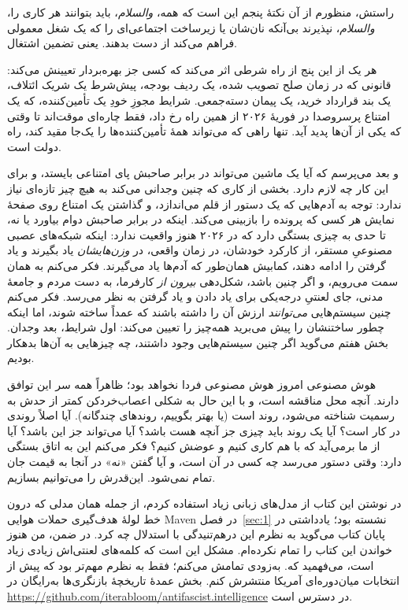 راستش، منظورم از آن نکتهٔ پنجم این است که همه، \emph{والسلام}، باید بتوانند هر کاری را، \emph{والسلام}، نپذیرند بی‌آنکه نان‌شان یا زیرساخت اجتماعی‌ای را که یک شغل معمولی فراهم می‌کند از دست بدهند. یعنی تضمین اشتغال.

هر یک از این پنج از راه شرطی اثر می‌کند که کسی جز بهره‌بردار تعیینش می‌کند: قانونی که در زمان صلح تصویب شده، یک ردیف بودجه، پیش‌شرط یک شریک ائتلاف، یک بند قرارداد خرید، یک پیمان دسته‌جمعی. شرایط مجوزِ خودِ یک تأمین‌کننده، که یک امتناع پرسروصدا در فوریهٔ ۲۰۲۶ از همین راه رخ داد، فقط چاره‌ای موقت‌اند تا وقتی که یکی از آن‌ها پدید آید. تنها راهی که می‌تواند همهٔ تأمین‌کننده‌ها را یک‌جا مقید کند، راه دولت است.

و بعد می‌پرسم که آیا یک ماشین می‌تواند در برابر صاحبش پای امتناعی بایستد، و برای این کار چه لازم دارد. بخشی از کاری که چنین وجدانی می‌کند به هیچ چیز تازه‌ای نیاز ندارد: توجه به آدم‌هایی که یک دستور از قلم می‌اندازد، و گذاشتن یک امتناع روی صفحهٔ نمایش هر کسی که پرونده را بازبینی می‌کند. اینکه در برابر صاحبش دوام بیاورد یا نه، تا حدی به چیزی بستگی دارد که در ۲۰۲۶ هنوز واقعیت ندارد: اینکه شبکه‌های عصبی مصنوعیِ مستقر، از کارکرد خودشان، در زمان واقعی، در \emph{وزن‌هایشان} یاد بگیرند و یاد گرفتن را ادامه دهند، کمابیش همان‌طور که آدم‌ها یاد می‌گیرند. فکر می‌کنم به همان سمت می‌رویم، و اگر چنین باشد، شکل‌دهی \emph{بیرون از} کارفرما، به دست مردم و جامعهٔ مدنی، جای لعنتیِ درجه‌یکی برای یاد دادن و یاد گرفتن به نظر می‌رسد. فکر می‌کنم چنین سیستم‌هایی \emph{می‌توانند} ارزش آن را داشته باشند که عمداً ساخته شوند، اما اینکه چطور ساختنشان را پیش می‌برید همه‌چیز را تعیین می‌کند: اول شرایط، بعد وجدان. بخش هفتم می‌گوید اگر چنین سیستم‌هایی وجود داشتند، چه چیزهایی به آن‌ها بدهکار بودیم.

هوش مصنوعی امروز هوش مصنوعی فردا نخواهد بود؛ ظاهراً همه سر این توافق دارند. آنچه محل مناقشه است، و با این حال به شکلی اعصاب‌خردکن کمتر از حدش به رسمیت شناخته می‌شود، روند است (یا بهتر بگوییم، روندهای چندگانه). آیا اصلاً روندی در کار است؟ آیا یک روند باید چیزی جز آنچه هست باشد؟ آیا می‌تواند جز این باشد؟ آیا از ما برمی‌آید که با هم کاری کنیم و عوضش کنیم؟ فکر می‌کنم این به اتاق بستگی دارد: وقتی دستور می‌رسد چه کسی در آن است، و آیا گفتن «نه» در آنجا به قیمت جان تمام نمی‌شود. این‌قدرش را می‌توانیم بسازیم.

در نوشتن این کتاب از مدل‌های زبانی زیاد استفاده کردم، از جمله همان مدلی که درون خط لولهٔ هدف‌گیری حملات هوایی Maven در فصل~\ref{sec:1} نشسته بود؛ یادداشتی در پایان کتاب می‌گوید به نظرم این درهم‌تنیدگی با استدلال چه کرد. در ضمن، من هنوز خواندن این کتاب را تمام نکرده‌ام. مشکل این است که کلمه‌های لعنتی‌اش زیادی زیاد است، می‌فهمید که. به‌زودی تمامش می‌کنم؛ فقط به نظرم مهم‌تر بود که پیش از انتخابات میان‌دوره‌ای آمریکا منتشرش کنم. بخش عمدهٔ تاریخچهٔ بازنگری‌ها به‌رایگان در \url{https://github.com/iterabloom/antifascist.intelligence} در دسترس است.
